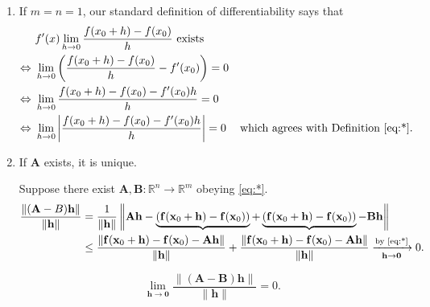 \documentclass[letterpaper, reqno,11pt]{article}
\newcommand{\RR}{\mathbb{R}}
\begin{document}
\begin{enumerate}
\item If $m = n = 1$, our standard definition of differentiability says that
  \begin{align*}
    & f'(x) \lim_{h \to 0} \frac{f(x_0 + h) - f(x_0)}{h} \text{ exists} \\
    \Leftrightarrow ~ & \lim_{h \to 0} \left(\frac{f(x_0 + h) - f(x_0)}{h} - f'(x_0)\right) = 0 \\
    \Leftrightarrow ~ & \lim_{h \to 0} \frac{f(x_0 + h) - f(x_0) - f'(x_0) h}{h} = 0 \\
    \Leftrightarrow ~ & \lim_{h \to 0} \left|\frac{f(x_0 + h) - f(x_0) - f'(x_0) h}{h}\right| = 0 && \text{which agrees with Definition \eqref{eq:*}}.
  \end{align*}
\item {} If $\mathbf A$ exists, it is unique.

  Suppose there exist $\mathbf A, \mathbf B : \RR^n \to \RR^m$ obeying \eqref{eq:*}.
  \begin{align*}
    \frac{\lVert (\mathbf A - B) \mathbf h \rVert}{\lVert \mathbf h \rVert} &= \frac{1}{\lVert \mathbf h \rVert} \left\lVert \mathbf A \mathbf h - \underbrace{\left(\mathbf f(\mathbf x_0 + \mathbf h) - \mathbf f(\mathbf x_0)\right)} + \underbrace{\left(\mathbf f(\mathbf x_0 + \mathbf h) - \mathbf f(\mathbf x_0)\right)} - \mathbf B \mathbf h \right\rVert \\
    &\leq \frac{\lVert \mathbf f(\mathbf x_0 + \mathbf h) - \mathbf f(\mathbf x_0) - \mathbf A \mathbf h \rVert}{\lVert \mathbf h \rVert} + \frac{\lVert \mathbf f(\mathbf x_0 + \mathbf h) - \mathbf f(\mathbf x_0) - \mathbf A \mathbf h \rVert}{\lVert \mathbf h \rVert} \xrightarrow[\mathbf h \to \mathbf 0]{\text{by \eqref{eq:*}}} 0.
  \end{align*}
  
  \begin{equation} \label{eq:**} \tag{**}
    \lim_{\mathbf h \to \mathbf 0} \frac{\lVert (\mathbf A - \mathbf B) \mathbf h \rVert}{\lVert \mathbf h \rVert} = 0.
  \end{equation}
  

\end{enumerate}
\end{document}

